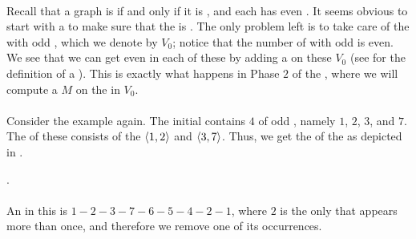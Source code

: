 \paragraph{}
Recall that a graph is  if and only if it is , and each  has even . It seems obvious to start with a  to make sure that the  is . The only problem left is to take care of the  with odd , which we denote by $V_0$; notice that the number of  with odd  is even. We see that we can get even  in each of these  by adding a  on these  $V_0$ (see  for the definition of a ). This is exactly what happens in Phase $2$ of the , where we will compute a  $M$ on the  in $V_0$.

\paragraph{}
\begin{example}
Consider the example again. The initial  contains $4$  of odd , namely $1$, $2$, $3$, and $7$. The  of these  consists of the  $\left\langle 1,2 \right\rangle$ and $\left\langle 3,7 \right\rangle$. Thus, we get the  of the  as depicted in .

.
\end{example}

\paragraph{}
An  in this  is $1-2-3-7-6-5-4-2-1$, where $2$ is the only  that appears more than once, and therefore we remove one of its occurrences.


